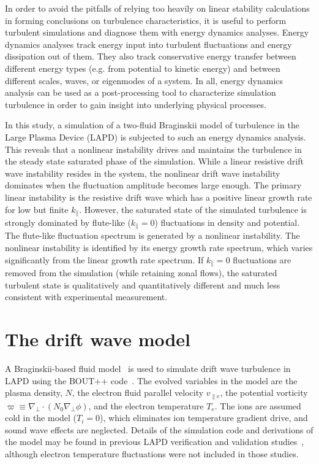 \documentclass[showpacs,preprintnumbers,amsmath,amssymb,superscriptaddress]{revtex4}
\def\grad{\nabla}
\newcommand{\gradperp}{\grad_\perp}
\newcommand{\vpe}{v_{\parallel e}}
\begin{document}
In order to avoid the pitfalls of relying too heavily on linear stability calculations in forming conclusions on turbulence characteristics, it is useful to perform turbulent simulations
and diagnose them with energy dynamics analyses. Energy dynamics analyses track energy input into turbulent fluctuations and energy dissipation out of them. 
They also track conservative energy transfer
between different energy types (e.g. from potential to kinetic energy) and between different scales, waves, or eigenmodes of a system. 
In all, energy dynamics analysis can be used as a post-processing
tool to characterize simulation turbulence in order to gain insight into underlying physical processes. 

In this study, a simulation of a
two-fluid Braginskii model of turbulence in the Large Plasma Device (LAPD) is subjected to such an energy dynamics analysis. This reveals that a nonlinear instability drives and maintains
the turbulence in the steady state saturated phase of the simulation. While a linear resistive drift wave instability resides in the system, the nonlinear drift wave instability dominates
when the fluctuation amplitude becomes large enough. The primary linear instability is the resistive drift wave which has a positive linear
growth rate for low but finite $k_\parallel$.  However, the saturated state of the simulated turbulence is strongly dominated by flute-like ($k_\parallel = 0$) fluctuations in density and potential.
The flute-like fluctuation spectrum is generated by a nonlinear instability.  The nonlinear instability is identified by its energy growth rate spectrum, which
varies significantly from the linear growth rate spectrum.  If $k_\parallel=0$ fluctuations are removed from the simulation (while retaining zonal flows), 
the saturated turbulent state is qualitatively and quantitatively different and much less consistent with experimental measurement.


\section{The drift wave model}
\label{dw_model}

A Braginskii-based fluid model~\cite{Braginskii1965} is used to simulate drift wave turbulence in LAPD using the BOUT++ code~\cite{dudson2009}. 
The evolved variables in the model are the plasma density, $N$, the electron fluid parallel velocity $\vpe$, the potential vorticity $\varpi \equiv \gradperp \cdot (N_0 \gradperp \phi)$,
and the electron temperature $T_e$. The ions are assumed cold in the
model ($T_i = 0$), which eliminates ion temperature gradient drive,
and sound wave effects are neglected. Details of the simulation code and derivations of the model
may be found in previous LAPD verification and validation studies~\cite{Popovich2010a,Popovich2010b,Umansky2011,friedman2012}, 
although electron temperature fluctuations were not included in those studies.
\end{document}
